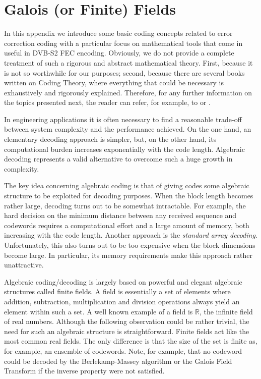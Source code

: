 
\chapter{Galois (or Finite) Fields}

In this appendix we introduce some basic coding concepts related to error correction coding with a particular focus on mathematical tools that come in useful in DVB-S2 FEC encoding. Obviously, we do not provide a complete treatment of such a rigorous and abstract mathematical theory. First, because it is not so worthwhile for our purposes; second, because there are several books written on Coding Theory, where everything that could be necessary is exhaustively and rigorously explained. Therefore, for any further information on the topics presented next, the reader can refer, for example, to \cite{b:moon} or \cite{b:mcwilliams}.

In engineering applications it is often necessary to find a reasonable trade-off between system complexity and the performance achieved. On the one hand, an elementary decoding approach is simpler, but, on the other hand, its computational burden increases exponentially with the code length. Algebraic decoding represents a valid alternative to overcome such a huge growth in complexity.

The key idea concerning algebraic coding is that of giving codes some algebraic structure to be exploited for decoding purposes. When the block length becomes rather large, decoding turns out to be somewhat intractable. For example, the hard decision on the minimum distance between any received sequence and codewords requires a computational effort and a large amount of memory, both increasing with the code length. Another approach is the \emph{standard array decoding}. Unfortunately, this also turns out to be too expensive when the block dimensions become large. In particular, its memory requirements make this approach rather unattractive.

Algebraic coding/decoding is largely based on powerful and elegant algebraic structures called finite fields.
A field is essentially a set of elements where addition, subtraction, multiplication and division operations always yield an element within such a set. A well known example of a field is \(\mathbb R\), the infinite field of real numbers. Although the following observation could be rather trivial, the need for such an algebraic structure is straightforward. Finite fields act like the most common real fields. The only difference is that the size of the set is finite as, for example, an ensemble of codewords. Note, for example, that no codeword could be decoded by the Berlekamp-Massey algorithm or the Galois Field Transform if the inverse property were not satisfied.

